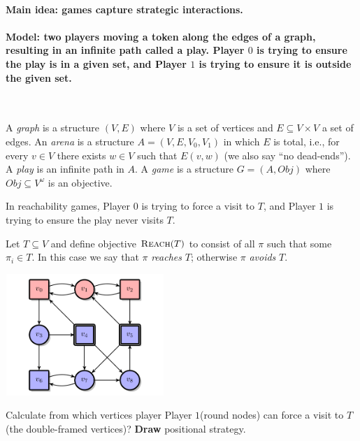 \documentclass[a4paper,10pt]{article}
\newcommand{\pz}{Player $0$\xspace}
\newcommand{\po}{Player $1$\xspace}
\newcommand{\reach}[1]{\textsc{Reach}(#1)}
\newcommand{\obj}{Obj}
\begin{document}
\paragraph{Main idea: games capture strategic interactions.}

\paragraph{Model: two players moving a token along the edges of a graph, resulting in an infinite path called a play. \pz is trying to ensure 
the play is in a given set, and \po is trying to ensure it is outside the given set.}

\begin{definition}
\

\en
\- A \emph{graph} is a structure $(V,E)$ where $V$ is a set of vertices and $E \subseteq V \times V$ a set of edges.
\- An \emph{arena} is a structure $A = (V,E,V_0,V_1)$ in which $E$ is total, i.e., for every $v \in V$ there exists $w \in V$ such that $E(v,w)$ (we also say ``no dead-ends'').
\- A \emph{play} is an infinite path in $A$.
\- A \emph{game} is a structure $G=(A,\obj)$ where $\obj \subseteq V^\omega$ is an objective.
\ne
\end{definition}

In reachability games, \pz is trying to force a visit to $T$, and \po is 
trying to ensure the play never visits $T$.

\begin{definition}[Reachability]
 Let $T \subseteq V$ and define objective $\reach{T}$ to consist of all  $\pi$ such that some $\pi_i \in T$. In this case we say that $\pi$ \emph{reaches} $T$; otherwise $\pi$ \emph{avoids} $T$.
\end{definition}

\begin{center}\includegraphics[width=6cm,height=4.6cm]{arena.png} \end{center}

\begin{example}
Calculate from which vertices player \po (round nodes) can force a visit to $T$ (the double-framed vertices)? \textbf{Draw} positional strategy.
\end{example}
\end{document}
